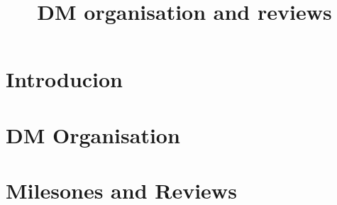 \documentclass[]{lsstbeamer}
\title[DM Organisation]{DM organisation and reviews  }
\begin{document}
\frame[plain]{\titlepage }
\section{Introducion}

\section{DM Organisation }


\section {Milesones and Reviews }



\end{document}
